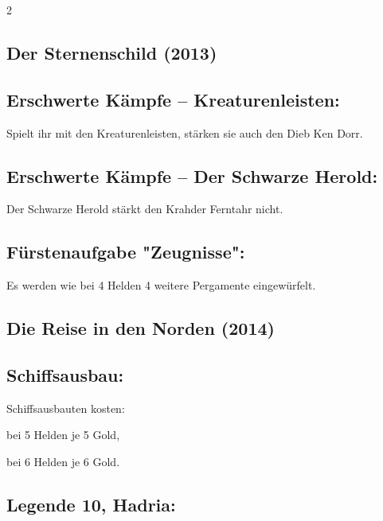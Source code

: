 \documentclass[10pt, a4paper, oneside]{book}
\begin{document}
\begin{multicols*}{2}
\begin{bgcolor}
\end{bgcolor}



\begin{bgcolor}
\section{Der Sternenschild (2013)}


\subsection{Erschwerte Kämpfe – Kreaturenleisten:}

Spielt ihr mit den Kreaturenleisten, stärken sie auch den Dieb Ken Dorr.
\supercite{NH:Begleitheft}

\subsection{Erschwerte Kämpfe – Der Schwarze Herold:} 

Der Schwarze Herold stärkt den Krahder Ferntahr nicht.
\supercite{NH:Begleitheft}


\subsection{Fürstenaufgabe "Zeugnisse":}

Es werden wie bei 4 Helden 4 weitere Pergamente eingewürfelt.
\supercite{NH:Begleitheft}

\end{bgcolor}





\begin{bgcolor}
\section{Die Reise in den Norden (2014)}


\subsection{Schiffsausbau:}

Schiffsausbauten kosten:
\supercite{DRidN:Begleitheft}

\bullet{} bei 5 Helden je 5 Gold,

\bullet{} bei 6 Helden je 6 Gold.



\subsection{Legende 10, Hadria:}


\end{bgcolor}
\end{multicols*}
\end{document}
